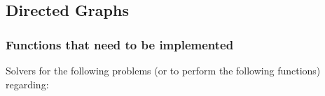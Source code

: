\subsection{Directed Graphs}
\label{ssec:DirectedGraphs}



\subsubsection{Functions that need to be implemented}
\label{sssec:FunctionsThatNeedToBeImplemented}




Solvers for the following problems (or to perform the following functions) regarding: \vspace{-0.3cm}
